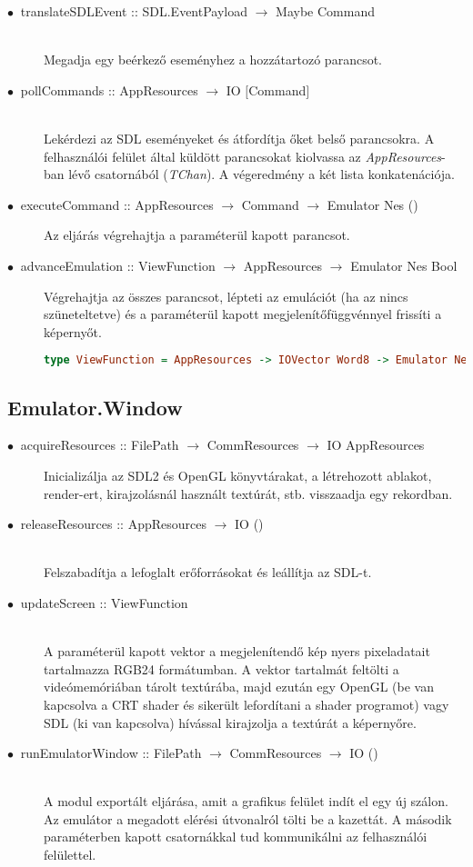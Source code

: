 \begin{description}
	\item[$\bullet\:$ translateSDLEvent :: SDL.EventPayload $\rightarrow$ Maybe Command] \hfill \\
	Megadja egy beérkező eseményhez a hozzátartozó parancsot.
	\item[$\bullet\:$ pollCommands :: AppResources $\rightarrow$ IO $\lbrack$Command$\rbrack$] \hfill \\
	Lekérdezi az SDL eseményeket és átfordítja őket belső parancsokra. A felhasználói felület által küldött parancsokat kiolvassa az \emph{AppResources}-ban lévő csatornából (\emph{TChan}). A végeredmény a két lista konkatenációja. 
	\item[$\bullet\:$ executeCommand :: AppResources $\rightarrow$ Command $\rightarrow$ Emulator Nes ()] \hfill
	Az eljárás végrehajtja a paraméterül kapott parancsot.
	\item[$\bullet\:$ advanceEmulation :: ViewFunction $\rightarrow$ AppResources $\rightarrow$ Emulator Nes Bool] \hfill
	Végrehajtja az összes parancsot, lépteti az emulációt (ha az nincs szüneteltetve) és a paraméterül kapott megjelenítőfüggvénnyel frissíti a képernyőt.
	\begin{lstlisting}[language=Haskell, basicstyle=\scriptsize]
	type ViewFunction = AppResources -> IOVector Word8 -> Emulator Nes ()
	\end{lstlisting}
\end{description}

\subsection{Emulator.Window}

\begin{description}
	\item[$\bullet\:$ acquireResources :: FilePath $\rightarrow$ CommResources $\rightarrow$ IO AppResources] \hfill Inicializálja az SDL2 és OpenGL könyvtárakat, a létrehozott ablakot, render-ert, kirajzolásnál használt textúrát, stb. visszaadja egy rekordban.
	\item[$\bullet\:$ releaseResources :: AppResources $\rightarrow$ IO ()] \hfill \\
	Felszabadítja a lefoglalt erőforrásokat és leállítja az SDL-t.
	\item[$\bullet\:$ updateScreen :: ViewFunction] \hfill \\
	A paraméterül kapott vektor a megjelenítendő kép nyers pixeladatait tartalmazza RGB24 formátumban. A vektor tartalmát feltölti a videómemóriában tárolt textúrába, majd ezután egy OpenGL (be van kapcsolva a CRT shader és sikerült lefordítani a shader programot) vagy SDL (ki van kapcsolva) hívással kirajzolja a textúrát a képernyőre.
	\item[$\bullet\:$ runEmulatorWindow :: FilePath $\rightarrow$ CommResources $\rightarrow$ IO ()] \hfill \\
	A modul exportált eljárása, amit a grafikus felület indít el egy új szálon. Az emulátor a megadott elérési útvonalról tölti be a kazettát. A második paraméterben kapott csatornákkal tud kommunikálni az felhasználói felülettel.
\end{description}

